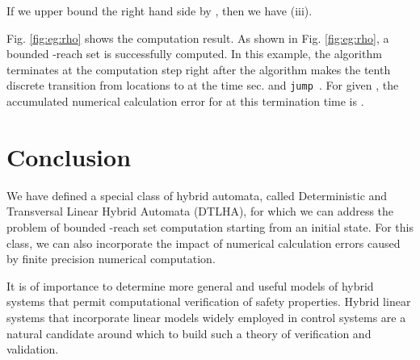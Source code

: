 If we upper bound the right hand side by , then we have (iii).


Fig. \ref{fig:eg:rho} shows the computation result.
As shown in Fig. \ref{fig:eg:rho}, a bounded -reach set is successfully computed.
In this example, the algorithm terminates at the computation step  right after the algorithm makes the tenth discrete transition from locations  to  at the time  sec. and {\tt jump }.
For given , the accumulated numerical calculation error  for  at this termination time is .




\section{Conclusion} \label{sec:con}
We have defined a special class of hybrid automata, called Deterministic and Transversal Linear Hybrid Automata (DTLHA), for which we can address the problem of bounded -reach set computation starting from an initial state.
For this class, we can also incorporate the impact of numerical calculation errors caused by finite precision numerical computation.

It is of importance to determine more  general and useful models of hybrid systems that permit computational verification of safety properties. Hybrid linear systems that incorporate linear models widely employed in control systems are a natural candidate around which to build such a theory of verification and validation.











